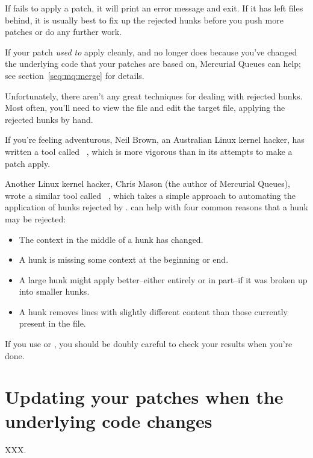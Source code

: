 If  fails to apply a patch, it will print an error
message and exit.  If it has left  files behind, it is
usually best to fix up the rejected hunks before you push more patches
or do any further work.

If your patch \emph{used to} apply cleanly, and no longer does because
you've changed the underlying code that your patches are based on,
Mercurial Queues can help; see section~\ref{seq:mq:merge} for details.

Unfortunately, there aren't any great techniques for dealing with
rejected hunks.  Most often, you'll need to view the 
file and edit the target file, applying the rejected hunks by hand.

If you're feeling adventurous, Neil Brown, an Australian Linux kernel
hacker, has written a tool called ~\cite{web:wiggle},
which is more vigorous than  in its attempts to make a
patch apply.

Another Linux kernel hacker, Chris Mason (the author of Mercurial
Queues), wrote a similar tool called ~\cite{web:rej},
which takes a simple approach to automating the application of hunks
rejected by .   can help with four common
reasons that a hunk may be rejected:

\begin{itemize}
\item The context in the middle of a hunk has changed.
\item A hunk is missing some context at the beginning or end.
\item A large hunk might apply better--either entirely or in part--if
  it was broken up into smaller hunks.
\item A hunk removes lines with slightly different content than those
  currently present in the file.
\end{itemize}

If you use  or , you should be doubly
careful to check your results when you're done.

\section{Updating your patches when the underlying code changes}
\label{sec:mq:merge}

XXX.


